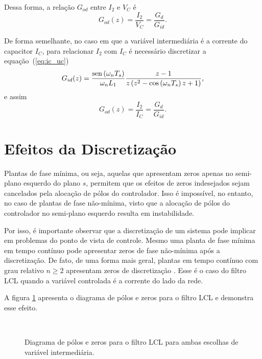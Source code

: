     Dessa forma, a relação $G_{od}$ entre $I_2$ e $V_C$ é
    \begin{equation}
        G_{od}(z) = \frac{I_2}{V_C} = \frac{G_d}{G_{id}} \text{.}
    \end{equation}

    De forma semelhante, no caso em que a variável intermediária é a corrente do
    capacitor $I_C$, para relacionar $I_2$ com $I_C$ é necessário discretizar a
    equação~(\ref{eq:ic_uc})
    \begin{equation}
        G_{id}(z) = \frac{\operatorname{sen} \left( \omega_n T_s \right)}{\omega_n L_1}
            \frac{z-1}{z \left( z^2 - \cos \left( \omega_n T_s \right) z + 1 \right)}
            \text{,}
    \end{equation}
    e assim
    \begin{equation}
        G_{od}(z) = \frac{I_2}{I_C} = \frac{G_d}{G_{id}} \text{.}
    \end{equation}


\section{Efeitos da Discretização}

    Plantas de fase mínima, ou seja, aquelas que apresentam zeros apenas no
    semi-plano esquerdo do plano $s$, permitem que os efeitos de zeros indesejados
    sejam cancelados pela alocação de pólos do controlador. Isso é impossível,
    no entanto, no caso de plantas de fase não-mínima, visto que a alocação de
    pólos do controlador no semi-plano esquerdo resulta em instabilidade.

    Por isso, é importante observar que a discretização de um sistema pode implicar
    em problemas do ponto de vista de controle. Mesmo uma planta de fase mínima em
    tempo contínuo pode apresentar zeros de fase não-mínima após a discretização.
    De fato, de uma forma mais geral, plantas em tempo contínuo com grau relativo
    $n \ge 2$ apresentam zeros de discretização \cite{ref:ASTROM}. Esse é o caso
    do filtro LCL quando a variável controlada é a corrente do lado da rede.


    A figura \ref{fig:pzmap_ic_vc} apresenta o diagrama de pólos e zeros para o
    filtro LCL e demonstra esse efeito.

    \begin{figure}[htb]
        \centering
        \\
        \renewcommand\figurename{Fig.}
        \caption{Diagrama de pólos e zeros para o filtro LCL para ambas escolhas
            de variável intermediária.}
        \label{fig:pzmap_ic_vc}
    \end{figure}


